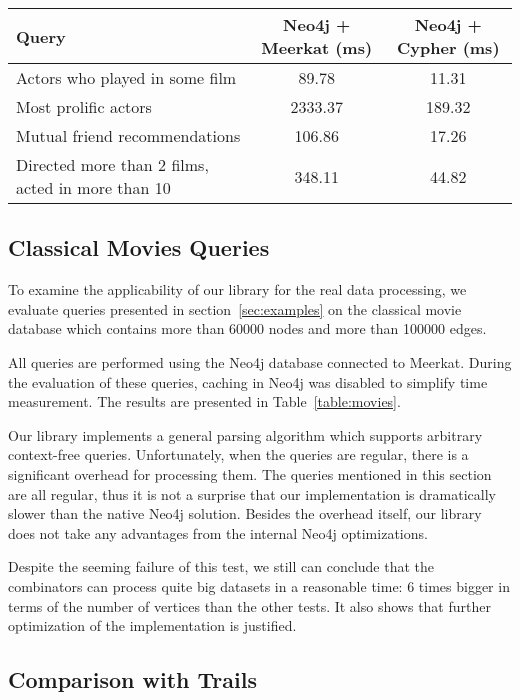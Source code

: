 \begin{table*}[t]
\small
\centering
\caption{Running regular queries using Meerkat and Cypher}
\label{table:movies}
\begin{tabular}{|l|c|c|}
\hline
{Query} &
{Neo4j + Meerkat (ms)} &
{Neo4j + Cypher (ms)} \\
\hline
\hline
Actors who played in some film & 89.78 & 11.31 \\
Most prolific actors & 2333.37 & 189.32 \\
Mutual friend recommendations & 106.86 & 17.26 \\
Directed more than 2 films, acted in more than 10 & 348.11 & 44.82 \\
\hline
\end{tabular}
\end{table*}

\subsection{Classical Movies Queries}

To examine the applicability of our library for the real data processing, we evaluate queries presented in section~\ref{sec:examples} on the classical movie database which contains more than 60000 nodes and more than 100000 edges.

All queries are performed using the Neo4j database connected to Meerkat.
During the evaluation of these queries, caching in Neo4j was disabled to simplify time measurement.
The results are presented in Table~\ref{table:movies}.

Our library implements a general parsing algorithm which supports arbitrary context-free queries.
Unfortunately, when the queries are regular, there is a significant overhead for processing them.
The queries mentioned in this section are all regular, thus it is not a surprise that our implementation is dramatically slower than the native Neo4j solution. Besides the overhead itself, our library does not take any advantages from the internal Neo4j optimizations.

Despite the seeming failure of this test, we still can conclude that the combinators can process quite big datasets in a reasonable time: 6 times bigger in terms of the number of vertices than the other tests.
It also shows that further optimization of the implementation is justified.

\subsection{Comparison with Trails}

